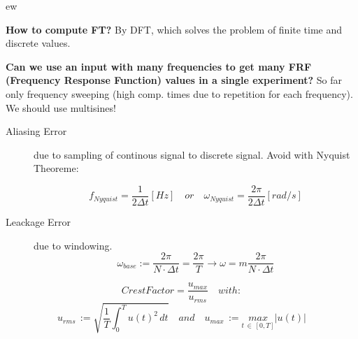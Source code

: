 ew%
\begin{tcolorbox}[colback=brown!5!white,colframe=brown!75!black,title=\textbf{Fourier Transformation}]
\textbf{How to compute FT?} By DFT, which solves the problem of finite time and discrete values.

\textbf{Can we use an input with many frequencies to get many FRF (Frequency Response Function) values in a single experiment?} So far only frequency sweeping (high comp. times due to repetition for each frequency). We should use multisines!
\end{tcolorbox}

\begin{tcolorbox}[colback=brown!5!white,colframe=brown!75!black,title=\textbf{Aliasing and Leakage Errors}]
\begin{description}
\item[Aliasing Error] due to sampling of continous signal to discrete signal. Avoid with Nyquist Theoreme:

\begin{equation*}
f_{Nyquist} = \frac{1}{2\Delta t} [Hz] \quad or \quad \omega_{Nyquist} = \frac{2 \pi }{ 2\Delta t} [rad/s]
\end{equation*}

\item[Leackage Error] due to windowing.
\begin{equation*}
\omega _{ base }:=\frac { 2\pi  }{ N\cdot \Delta t } =\frac { 2\pi  }{ T }  \rightarrow \omega = m\frac { 2\pi  }{ N\cdot \Delta t }
\end{equation*}
\end{description}
\end{tcolorbox}

\begin{tcolorbox}[colback=brown!5!white,colframe=brown!75!black,title=\textbf{Crest Factor = Scheitelfaktor}]
\begin{equation*}
CrestFactor=\frac { u_{ max } }{ u_{ rms } } \quad with:
\end{equation*}
\begin{equation*}
u_{ rms }\, := \sqrt{ \frac { 1 }{ T } \int _{ 0 }^{ T }{ u(t)^2 \, dt }  } \quad and \quad u_{ max }\, :=\underset { t\, \in \, [0,T] }{ max } |u(t)|
\end{equation*}
\end{tcolorbox}

